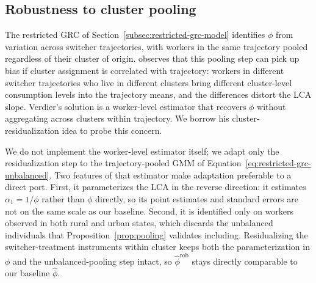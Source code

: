 
\subsection{Robustness to cluster pooling}\label{subsec:verdier-robustness}

The restricted GRC of Section~\ref{subsec:restricted-grc-model} identifies $\phi$ from variation across switcher trajectories, with workers in the same trajectory pooled regardless of their cluster of origin.
\citet{verdierAverageTreatmentEffects2020a} observes that this pooling step can pick up bias if cluster assignment is correlated with trajectory: workers in different switcher trajectories who live in different clusters bring different cluster-level consumption levels into the trajectory means, and the differences distort the LCA slope.
Verdier's solution is a worker-level estimator that recovers $\phi$ without aggregating across clusters within trajectory.
We borrow his cluster-residualization idea to probe this concern.

We do not implement the worker-level estimator itself; we adapt only the residualization step to the trajectory-pooled GMM of Equation~\eqref{eq:restricted-grc-unbalanced}.
Two features of that estimator make adaptation preferable to a direct port.
First, it parameterizes the LCA in the reverse direction: it estimates $\alpha_1 = 1/\phi$ rather than $\phi$ directly, so its point estimates and standard errors are not on the same scale as our baseline.
Second, it is identified only on workers observed in both rural and urban states, which discards the unbalanced individuals that Proposition~\ref{prop:pooling} validates including.
Residualizing the switcher-treatment instruments within cluster keeps both the parameterization in $\phi$ and the unbalanced-pooling step intact, so $\hat\phi^{\mathrm{rob}}$ stays directly comparable to our baseline $\hat\phi$.

